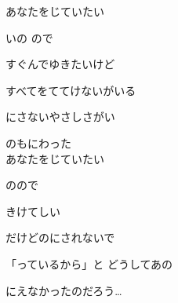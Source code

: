 {あなたをじていたい

いの ので

すぐんでゆきたいけど

すべてをててけないがいる

にさないやさしさがい

のもにわった
\\

あなたをじていたい

のので

きけてしい

だけどのにされないで

「っているから」と どうしてあの

にえなかったのだろう…

}